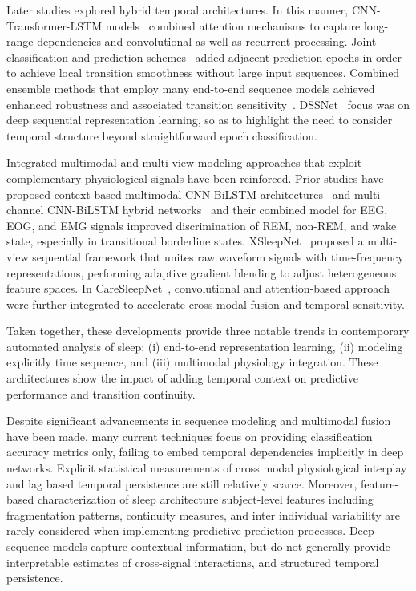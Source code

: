 \documentclass[10pt]{cai26}
\begin{document}
Later studies explored hybrid temporal architectures. In this manner, CNN-Transformer-LSTM models~\cite{Pham2023} combined attention 
mechanisms to capture long-range dependencies and convolutional as well as recurrent processing. Joint 
classification-and-prediction schemes~\cite{Phan2019J} added adjacent prediction epochs in order to achieve local transition smoothness 
without large input sequences. Combined ensemble methods that employ many end-to-end sequence models achieved enhanced robustness 
and associated transition sensitivity~\cite{Wang2020}. DSSNet~\cite{Chang2022} focus was on deep sequential representation learning, so as to 
highlight the need to consider temporal structure beyond straightforward epoch classification. 

Integrated multimodal and multi-view modeling approaches that exploit complementary physiological signals have been reinforced. 
Prior studies have proposed context-based multimodal CNN-BiLSTM architectures~\cite{Chambon2018} and multi-channel CNN-BiLSTM hybrid 
networks~\cite{Karim2025} and their combined model for EEG, EOG, and EMG signals improved discrimination of REM, non-REM, and wake state, 
especially in transitional borderline states. XSleepNet~\cite{Phan2022} proposed a multi-view sequential framework that unites raw 
waveform signals with time-frequency representations, performing adaptive gradient blending to adjust heterogeneous feature 
spaces. In CareSleepNet~\cite{Wang2024}, convolutional and attention-based approach were further integrated to accelerate cross-modal 
fusion and temporal sensitivity.

Taken together, these developments provide three notable trends in contemporary automated analysis of sleep: (i) end-to-end 
representation learning, (ii) modeling explicitly time sequence, and (iii) multimodal physiology integration. These architectures 
show the impact of adding temporal context on predictive performance and transition continuity. 

Despite significant advancements in sequence modeling and multimodal fusion have been made, many current techniques focus on 
providing classification accuracy metrics only, failing to embed temporal dependencies implicitly in deep networks. Explicit 
statistical measurements of cross modal physiological interplay and lag based temporal persistence are still relatively scarce. 
Moreover, feature-based characterization of sleep architecture subject-level features including fragmentation patterns, continuity 
measures, and inter individual variability are rarely considered when implementing predictive prediction processes. Deep sequence 
models capture contextual information, but do not generally provide interpretable estimates of cross-signal interactions, and 
structured temporal persistence.
\end{document}
